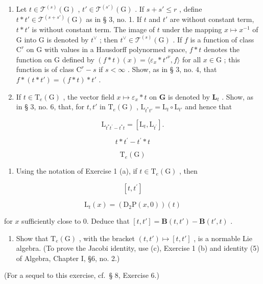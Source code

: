 \begin{enumerate}
\def\labelenumi{(\alph{enumi})}
\item
  Let \(t \in \mathcal{T}^{(s)}(\mathrm{G})\) , \(t' \in \mathcal{T}^{(s')}(\mathrm{G})\) . If \(s + s' \leqslant r\) , define \(t * t' \in \mathcal{T}^{(s + s')}(\mathrm{G})\) as in § 3, no. 1. If \(t\) and \(t'\) are without constant term, \(t * t'\) is without constant term. The image of \(t\) under the mapping \(x \mapsto x^{-1}\) of \(\mathrm{G}\) into \(\mathrm{G}\) is denoted by \(t^{\vee}\) ; then \(t^{\vee} \in \mathcal{T}^{(s)}(\mathrm{G})\) . If \(f\) is a function of class \(\mathrm{C}^r\) on \(\mathrm{G}\) with values in a Hausdorff polynormed space, \(f * t\) denotes the function on \(\mathrm{G}\) defined by \((f * t)(x) = \langle \varepsilon_x * t'^{\nu}, f \rangle\) for all \(x \in \mathrm{G}\) ; this function is of class \(\mathrm{C}^r - s\) if \(s < \infty\) . Show, as in § 3, no. 4, that \(f * (t * t') = (f * t) * t'\) .
\item
  If \(t \in \mathrm{T}_e(\mathrm{G})\) , the vector field \(x \mapsto \varepsilon_x * t\) on \(\mathbf{G}\) is denoted by \(\mathbf{L}_t\) . Show, as in § 3, no. 6, that, for \(t, t'\) in \(\mathrm{T}_e(\mathrm{G})\) , \(\mathrm{L}_{t^* t'} = \mathrm{L}_t \circ \mathrm{L}_{t'}\) and hence that
\end{enumerate}

\[
\mathrm{L} _ {t ^ {*} t ^ {\prime} - t ^ {*} t} = \left[ \mathrm{L} _ {t}, \mathrm{L} _ {t ^ {\prime}} \right].
\]

\[
t * t ^ {\prime} - t ^ {\prime} * t
\]

\[
\mathrm{T} _ {e} (\mathrm{G})
\]

\begin{enumerate}
\def\labelenumi{(\alph{enumi})}
\setcounter{enumi}{2}
\tightlist
\item
  Using the notation of Exercise 1 (a), if \(t \in \mathrm{T}_e(\mathrm{G})\) , then
\end{enumerate}

\[
[ t, t ^ {\prime} ]
\]

\[
\mathrm{L} _ {t} (x) = (\mathrm{D} _ {2} \mathrm{P} (x, 0)) (t)
\]

for \(x\) sufficiently close to 0. Deduce that \([t, t'] = \mathbf{B}(t, t') - \mathbf{B}(t', t)\) .

\begin{enumerate}
\def\labelenumi{(\alph{enumi})}
\setcounter{enumi}{3}
\tightlist
\item
  Show that \(\mathrm{T}_e(\mathrm{G})\) , with the bracket \((t, t') \mapsto [t, t']\) , is a normable Lie algebra. (To prove the Jacobi identity, use (c), Exercise 1 (b) and identity (5) of Algebra, Chapter I, §6, no. 2.)
\end{enumerate}

(For a sequel to this exercise, cf.~§ 8, Exercise 6.)


